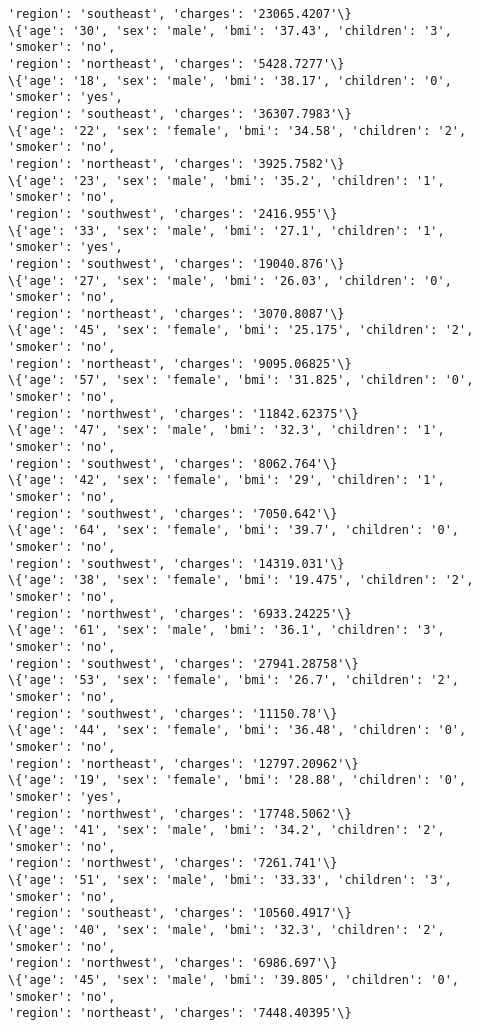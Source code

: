 \documentclass[11pt]{article}
\begin{document}
\begin{Verbatim}[commandchars=\\\{\}]
'region': 'southeast', 'charges': '23065.4207'\}
\{'age': '30', 'sex': 'male', 'bmi': '37.43', 'children': '3', 'smoker': 'no',
'region': 'northeast', 'charges': '5428.7277'\}
\{'age': '18', 'sex': 'male', 'bmi': '38.17', 'children': '0', 'smoker': 'yes',
'region': 'southeast', 'charges': '36307.7983'\}
\{'age': '22', 'sex': 'female', 'bmi': '34.58', 'children': '2', 'smoker': 'no',
'region': 'northeast', 'charges': '3925.7582'\}
\{'age': '23', 'sex': 'male', 'bmi': '35.2', 'children': '1', 'smoker': 'no',
'region': 'southwest', 'charges': '2416.955'\}
\{'age': '33', 'sex': 'male', 'bmi': '27.1', 'children': '1', 'smoker': 'yes',
'region': 'southwest', 'charges': '19040.876'\}
\{'age': '27', 'sex': 'male', 'bmi': '26.03', 'children': '0', 'smoker': 'no',
'region': 'northeast', 'charges': '3070.8087'\}
\{'age': '45', 'sex': 'female', 'bmi': '25.175', 'children': '2', 'smoker': 'no',
'region': 'northeast', 'charges': '9095.06825'\}
\{'age': '57', 'sex': 'female', 'bmi': '31.825', 'children': '0', 'smoker': 'no',
'region': 'northwest', 'charges': '11842.62375'\}
\{'age': '47', 'sex': 'male', 'bmi': '32.3', 'children': '1', 'smoker': 'no',
'region': 'southwest', 'charges': '8062.764'\}
\{'age': '42', 'sex': 'female', 'bmi': '29', 'children': '1', 'smoker': 'no',
'region': 'southwest', 'charges': '7050.642'\}
\{'age': '64', 'sex': 'female', 'bmi': '39.7', 'children': '0', 'smoker': 'no',
'region': 'southwest', 'charges': '14319.031'\}
\{'age': '38', 'sex': 'female', 'bmi': '19.475', 'children': '2', 'smoker': 'no',
'region': 'northwest', 'charges': '6933.24225'\}
\{'age': '61', 'sex': 'male', 'bmi': '36.1', 'children': '3', 'smoker': 'no',
'region': 'southwest', 'charges': '27941.28758'\}
\{'age': '53', 'sex': 'female', 'bmi': '26.7', 'children': '2', 'smoker': 'no',
'region': 'southwest', 'charges': '11150.78'\}
\{'age': '44', 'sex': 'female', 'bmi': '36.48', 'children': '0', 'smoker': 'no',
'region': 'northeast', 'charges': '12797.20962'\}
\{'age': '19', 'sex': 'female', 'bmi': '28.88', 'children': '0', 'smoker': 'yes',
'region': 'northwest', 'charges': '17748.5062'\}
\{'age': '41', 'sex': 'male', 'bmi': '34.2', 'children': '2', 'smoker': 'no',
'region': 'northwest', 'charges': '7261.741'\}
\{'age': '51', 'sex': 'male', 'bmi': '33.33', 'children': '3', 'smoker': 'no',
'region': 'southeast', 'charges': '10560.4917'\}
\{'age': '40', 'sex': 'male', 'bmi': '32.3', 'children': '2', 'smoker': 'no',
'region': 'northwest', 'charges': '6986.697'\}
\{'age': '45', 'sex': 'male', 'bmi': '39.805', 'children': '0', 'smoker': 'no',
'region': 'northeast', 'charges': '7448.40395'\}

\end{Verbatim}
\end{document}
